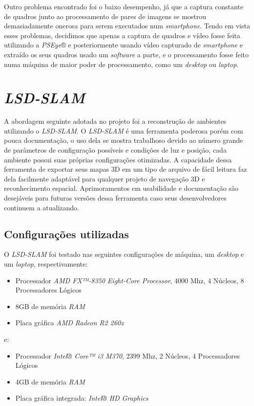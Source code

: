 Outro problema encontrado foi o baixo desempenho, já que a captura constante de quadros junto ao processamento de pares de imagens se mostrou demasiadamente onerosa para serem executados num \textit{smartphone}. Tendo em vista esses problemas, decidimos que apenas a captura de quadros e vídeo fosse feita utilizando a \textit{PSEye}® e posteriormente usando vídeo capturado de \textit{smartphone} e extraído os seus quadros usado um \textit{software} a parte, e o processamento fosse feito numa máquina de maior poder de processamento, como um \textit{desktop} ou \textit{laptop}.

\section{\textit{LSD-SLAM}}

A abordagem seguinte adotada no projeto foi a reconstrução de ambientes utilizando o \textit{LSD-SLAM}. O \textit{LSD-SLAM} é uma ferramenta poderosa porém com pouca documentação, o uso dela se mostra trabalhoso devido ao número grande de parâmetros de configuração possíveis e condições de luz e posição, cada ambiente possui suas próprias configurações otimizadas. A capacidade dessa ferramenta de exportar seus mapas 3D em um tipo de arquivo de fácil leitura faz dela facilmente adaptável para qualquer projeto de navegação 3D e reconhecimento espacial. Aprimoramentos em usabilidade e documentação são desejáveis para futuras versões dessa ferramenta caso seus desenvolvedores continuem a atualizando. 

\subsection{Configurações utilizadas}

O \textit{LSD-SLAM} foi testado nas seguintes configurações de máquina, um \textit{desktop} e um \textit{laptop}, respectivamente:

\begin{itemize}
	\item{Processador	\textit{AMD FX™-8350 Eight-Core Processor}, 4000 Mhz, 4 Núcleos, 8 Processadores Lógicos}
	\item{8GB de memória \textit{RAM}}
	\item{Placa gráfica \textit{AMD Radeon R2 260x}}
\end{itemize}

e:

\begin{itemize}
	\item{Processador \textit{Intel® Core™ i3 M370}, 2399 Mhz, 2 Núcleos, 4 Processadores Lógicos}
	\item{4GB de memória \textit{RAM}}
	\item{Placa gráfica integrada: \textit{Intel® HD Graphics}}
\end{itemize}	

